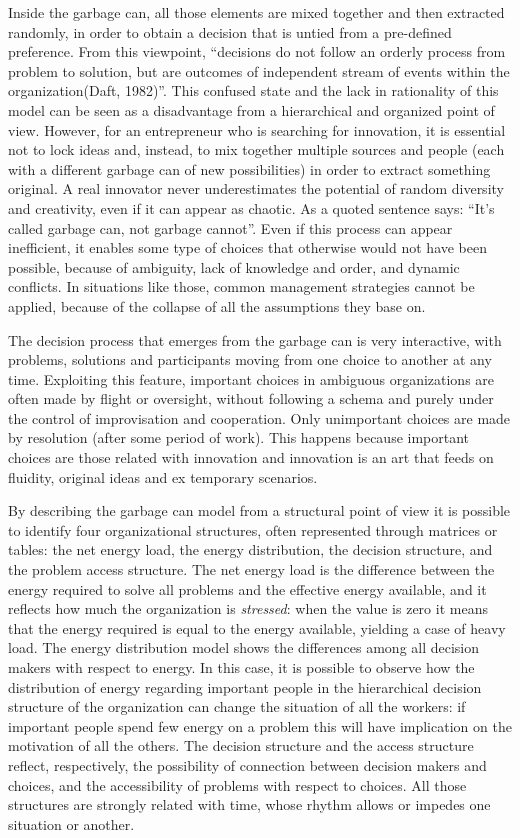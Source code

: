 Inside the garbage can, all those elements are mixed together and then extracted randomly, in order to obtain a decision that is untied from a pre-defined preference. From this viewpoint, ``decisions do not follow an orderly process from problem to solution, but are outcomes of independent stream of events within the organization(Daft, 1982)''\cite{3}. This confused state and the lack in rationality of this model can be seen as a disadvantage from a hierarchical and organized point of view. However, for an entrepreneur who is searching for innovation, it is essential not to lock ideas and, instead, to mix together multiple sources and people (each with a different garbage can of new possibilities) in order to extract something original. A real innovator never underestimates the potential of random diversity and creativity, even if it can appear as chaotic. As a quoted sentence says: ``It’s called garbage can, not garbage cannot''. Even if this process can appear inefficient, it enables some type of choices that otherwise would not have been possible, because of ambiguity, lack of knowledge and order, and dynamic conflicts. In situations like those, common management strategies cannot be applied, because of the collapse of all the assumptions they base on.

The decision process that emerges from the garbage can is very interactive, with problems, solutions and participants moving from one choice to another at any time. Exploiting this feature, important choices in ambiguous organizations are often made by flight or oversight, without following a schema and purely under the control of improvisation and cooperation. Only unimportant choices are made by resolution (after some period of work)\cite{1}. This happens because important choices are those related with innovation and innovation is an art that feeds on fluidity, original ideas and ex temporary scenarios.

By describing the garbage can model from a structural point of view it is possible to identify four organizational structures, often represented through matrices or tables: the net energy load, the energy distribution, the decision structure, and the problem access structure. The net energy load is the difference between the energy required to solve all problems and the effective energy available\cite{1}, and it reflects how much the organization is \textit{stressed}: when the value is zero it means that the energy required is equal to the energy available, yielding a case of heavy load. The energy distribution model shows the differences among all decision makers with respect to energy. In this case, it is possible to observe how the distribution of energy regarding important people in the hierarchical decision structure of the organization can change the situation of all the workers: if important people spend few energy on a problem this will have implication on the motivation of all the others. The decision structure and the access structure reflect, respectively, the possibility of connection between decision makers and choices, and the accessibility of problems with respect to choices. All those structures are strongly related with time, whose rhythm allows or impedes one situation or another.

